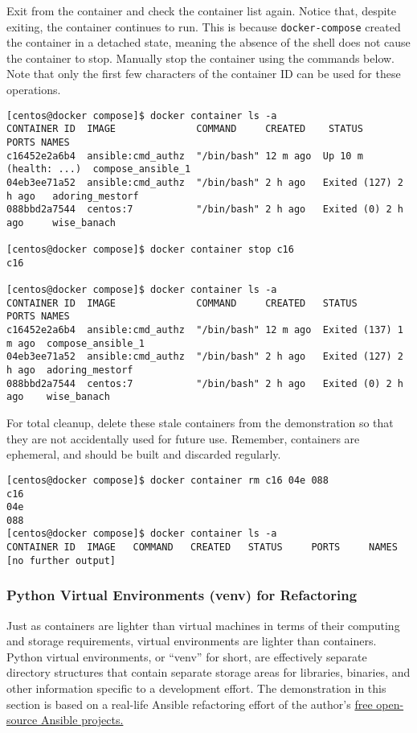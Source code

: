 Exit from the container and check the container list again. Notice that,
despite exiting, the container continues to run. This is because
\verb|docker-compose| created the container in a detached state, meaning the absence
of the shell does not cause the container to stop. Manually stop the container
using the commands below. Note that only the first few characters of the
container ID can be used for these operations.

\begin{verbatim}
[centos@docker compose]$ docker container ls -a
CONTAINER ID  IMAGE              COMMAND     CREATED    STATUS          PORTS NAMES
c16452e2a6b4  ansible:cmd_authz  "/bin/bash" 12 m ago  Up 10 m (health: ...)  compose_ansible_1
04eb3ee71a52  ansible:cmd_authz  "/bin/bash" 2 h ago   Exited (127) 2 h ago   adoring_mestorf
088bbd2a7544  centos:7           "/bin/bash" 2 h ago   Exited (0) 2 h ago     wise_banach

[centos@docker compose]$ docker container stop c16
c16

[centos@docker compose]$ docker container ls -a
CONTAINER ID  IMAGE              COMMAND     CREATED   STATUS          PORTS NAMES
c16452e2a6b4  ansible:cmd_authz  "/bin/bash" 12 m ago  Exited (137) 1 m ago  compose_ansible_1
04eb3ee71a52  ansible:cmd_authz  "/bin/bash" 2 h ago   Exited (127) 2 h ago  adoring_mestorf
088bbd2a7544  centos:7           "/bin/bash" 2 h ago   Exited (0) 2 h ago    wise_banach
\end{verbatim}

For total cleanup, delete these stale containers from the demonstration so
that they are not accidentally used for future use. Remember, containers are
ephemeral, and should be built and discarded regularly.


\begin{verbatim}
[centos@docker compose]$ docker container rm c16 04e 088
c16
04e
088
[centos@docker compose]$ docker container ls -a
CONTAINER ID  IMAGE   COMMAND   CREATED   STATUS     PORTS     NAMES
[no further output]
\end{verbatim}

\subsubsection{Python Virtual Environments (venv) for Refactoring}
Just as containers are lighter than virtual machines in terms of their
computing and storage requirements, virtual environments are lighter than
containers. Python virtual environments, or ``venv'' for short, are effectively
separate directory structures that contain separate storage areas for
libraries, binaries, and other information specific to a development effort.
The demonstration in this section is based on a real-life Ansible refactoring
effort of the author's
\href{https://github.com/nickrusso42518/}{free open-source Ansible projects.} \\

